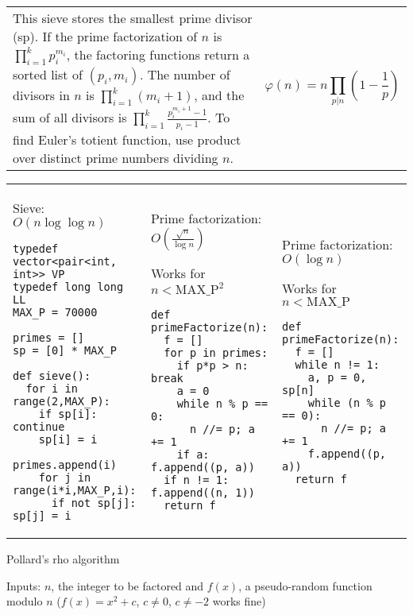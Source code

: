 \documentclass[letterpaper]{article}
\begin{document}
\begin{tabular}{@{}p{14cm}p{5cm}@{}}
    This sieve stores the smallest prime divisor (sp).
    If the prime factorization of $n$ is $\prod_{i=1}^{k}p_i^{m_i}$, the factoring functions return a sorted list of $(p_i, m_i)$. The number of divisors in $n$ is $\prod_{i=1}^{k}(m_i+1)$, and the sum of all divisors is $\prod_{i=1}^{k}\frac{p_i^{m_i+1}-1}{p_i-1}$. To find Euler's totient function, use product over distinct prime numbers dividing $n$.
     &
    \vspace{-1em}
    $$\varphi(n) = n\prod_{p|n}\left(1-\frac 1p\right)$$
\end{tabular}

\begin{tabular}{@{}p{6.5cm}p{6.5cm}p{6.5cm}@{}}

    Sieve: $O\left(n\log\log n\right)$

    \begin{lstlisting}
typedef vector<pair<int, int>> VP
typedef long long LL
MAX_P = 70000

primes = []
sp = [0] * MAX_P

def sieve():
  for i in range(2,MAX_P):
    if sp[i]: continue
    sp[i] = i
    primes.append(i)
    for j in range(i*i,MAX_P,i):
      if not sp[j]: sp[j] = i
\end{lstlisting}
     &
    Prime factorization: $O\left(\frac{\sqrt n}{\log n}\right)$

    Works for $n<\mathrm{MAX\_P}^2$
    \begin{lstlisting}
def primeFactorize(n):
  f = []
  for p in primes:
    if p*p > n: break
    a = 0
    while n % p == 0:
      n //= p; a += 1
    if a: f.append((p, a))
  if n != 1: f.append((n, 1))
  return f
\end{lstlisting}
     &
    Prime factorization: $O\left(\log n\right)$

    Works for $n<\mathrm{MAX\_P}$
    \begin{lstlisting}
def primeFactorize(n):
  f = []
  while n != 1:
    a, p = 0, sp[n]
    while (n % p == 0):
      n //= p; a += 1
    f.append((p, a))
  return f
\end{lstlisting}
\end{tabular}

\vspace{-2em}
Pollard's rho algorithm

Inputs: $n$, the integer to be factored and $f(x)$, a pseudo-random function modulo $n$ ($f(x)=x^2+c$, $c\neq 0$, $c\neq -2$ works fine)
\end{document}
